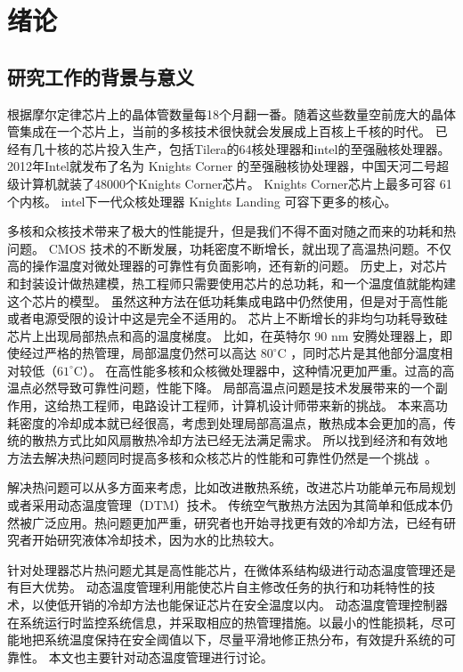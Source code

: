 
\chapter{绪论}
\section{研究工作的背景与意义}\label{sec:mean}
根据摩尔定律芯片上的晶体管数量每18个月翻一番。随着这些数量空前庞大的晶体管集成在一个芯片上，当前的多核技术很快就会发展成上百核上千核的时代。
已经有几十核的芯片投入生产，包括Tilera的64核处理器和intel的至强融核处理器。2012年Intel就发布了名为 Knights Corner 的至强融核协处理器，中国天河二号超级计算机就装了48000个Knights Corner芯片。
Knights Corner芯片上最多可容 61个内核。
intel下一代众核处理器 Knights Landing 可容下更多的核心。


多核和众核技术带来了极大的性能提升，但是我们不得不面对随之而来的功耗和热问题。
CMOS 技术的不断发展，功耗密度不断增长，就出现了高温热问题。不仅高的操作温度对微处理器的可靠性有负面影响，还有新的问题。
历史上，对芯片和封装设计做热建模，热工程师只需要使用芯片的总功耗，和一个温度值就能构建这个芯片的模型。
虽然这种方法在低功耗集成电路中仍然使用，但是对于高性能或者电源受限的设计中这是完全不适用的。
芯片上不断增长的非均匀功耗导致硅芯片上出现局部热点和高的温度梯度。
比如，在英特尔 90 nm 安腾处理器上，即使经过严格的热管理，局部温度仍然可以高达 $80 ^\circ$C ，同时芯片是其他部分温度相对较低（$61^\circ$C）。
在高性能多核和众核微处理器中，这种情况更加严重。过高的高温点必然导致可靠性问题，性能下降。
局部高温点问题是技术发展带来的一个副作用，这给热工程师，电路设计工程师，计算机设计师带来新的挑战。
本来高功耗密度的冷却成本就已经很高，考虑到处理局部高温点，散热成本会更加的高，传统的散热方式比如风扇散热冷却方法已经无法满足需求。
所以找到经济和有效地方法去解决热问题同时提高多核和众核芯片的性能和可靠性仍然是一个挑战~。


解决热问题可以从多方面来考虑，比如改进散热系统，改进芯片功能单元布局规划或者采用动态温度管理（DTM）技术。
传统空气散热方法因为其简单和低成本仍然被广泛应用。热问题更加严重，研究者也开始寻找更有效的冷却方法，已经有研究者开始研究液体冷却技术，因为水的比热较大。

针对处理器芯片热问题尤其是高性能芯片，在微体系结构级进行动态温度管理还是有巨大优势。
动态温度管理利用能使芯片自主修改任务的执行和功耗特性的技术，以使低开销的冷却方法也能保证芯片在安全温度以内。
动态温度管理控制器在系统运行时监控系统信息，并采取相应的热管理措施。以最小的性能损耗，尽可能地把系统温度保持在安全阈值以下，尽量平滑地修正热分布，有效提升系统的可靠性。
本文也主要针对动态温度管理进行讨论。



